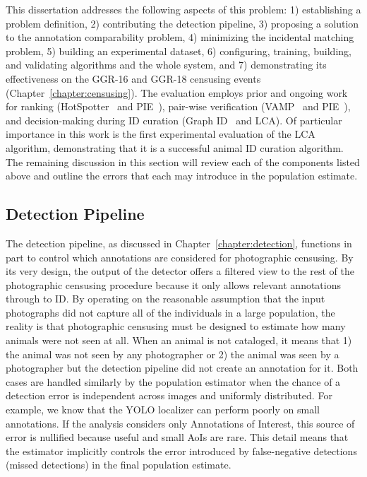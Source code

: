 \noindent This dissertation addresses the following aspects of this problem: 1) establishing a problem definition, 2) contributing the detection pipeline, 3) proposing a solution to the annotation comparability problem, 4) minimizing the incidental matching problem, 5) building an experimental dataset, 6) configuring, training, building, and validating algorithms and the whole system, and 7) demonstrating its effectiveness on the GGR-16 and GGR-18 censusing events (Chapter~\ref{chapter:censusing}).  The evaluation employs prior and ongoing work for ranking (HotSpotter~\cite{crall_hotspotter_2013} and PIE~\cite{moskvyak_robust_2019}), pair-wise verification (VAMP~\cite{crall_identifying_2017} and PIE~\cite{moskvyak_robust_2019}), and decision-making during ID curation (Graph ID~\cite{crall_identifying_2017} and LCA).  Of particular importance in this work is the first experimental evaluation of the LCA algorithm, demonstrating that it is a successful animal ID curation algorithm.  The remaining discussion in this section will review each of the components listed above and outline the errors that each may introduce in the population estimate.

\subsection{Detection Pipeline}

The detection pipeline, as discussed in Chapter~\ref{chapter:detection}, functions in part to control which annotations are considered for photographic censusing.  By its very design, the output of the detector offers a filtered view to the rest of the photographic censusing procedure because it only allows relevant annotations through to ID.  By operating on the reasonable assumption that the input photographs did not capture all of the individuals in a large population, the reality is that photographic censusing must be designed to estimate how many animals were not seen at all.  When an animal is not cataloged, it means that 1) the animal was not seen by any photographer or 2) the animal was seen by a photographer but the detection pipeline did not create an annotation for it.  Both cases are handled similarly by the population estimator when the chance of a detection error is independent across images and uniformly distributed.  For example, we know that the YOLO localizer can perform poorly on small annotations.  If the analysis considers only Annotations of Interest, this source of error is nullified because useful and small AoIs are rare.  This detail means that the estimator implicitly controls the error introduced by false-negative detections (missed detections) in the final population estimate.

